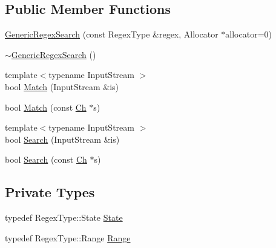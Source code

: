 \subsection*{Public Member Functions}
\begin{DoxyCompactItemize}
\item 
\hyperlink{classinternal_1_1GenericRegexSearch_a72f70e210a4bc944dba62655a008750b}{Generic\+Regex\+Search} (const Regex\+Type \&regex, Allocator $\ast$allocator=0)
\item 
\hyperlink{classinternal_1_1GenericRegexSearch_ad14ee51edf6f9bfe3b7cffa59c4c19c9}{$\sim$\+Generic\+Regex\+Search} ()
\item 
{\footnotesize template$<$typename Input\+Stream $>$ }\\bool \hyperlink{classinternal_1_1GenericRegexSearch_ad204164a20e3ac403b405683b51c2d0b}{Match} (Input\+Stream \&is)
\item 
bool \hyperlink{classinternal_1_1GenericRegexSearch_a9d3fe83905549d2fd4c513b8eacd14de}{Match} (const \hyperlink{classinternal_1_1GenericRegexSearch_a966f3a62fc838b5e9350f4c6a624d9a1}{Ch} $\ast$s)
\item 
{\footnotesize template$<$typename Input\+Stream $>$ }\\bool \hyperlink{classinternal_1_1GenericRegexSearch_a766c684321471b468ff468648f186cf0}{Search} (Input\+Stream \&is)
\item 
bool \hyperlink{classinternal_1_1GenericRegexSearch_a97398161c60f3ed3e4aabaff952c6f1e}{Search} (const \hyperlink{classinternal_1_1GenericRegexSearch_a966f3a62fc838b5e9350f4c6a624d9a1}{Ch} $\ast$s)
\end{DoxyCompactItemize}
\subsection*{Private Types}
\begin{DoxyCompactItemize}
\item 
typedef Regex\+Type\+::\+State \hyperlink{classinternal_1_1GenericRegexSearch_a0586261735313d8cf20042e50ee75c92}{State}
\item 
typedef Regex\+Type\+::\+Range \hyperlink{classinternal_1_1GenericRegexSearch_aaceb6517b628e447c6df61a8b7b33c7c}{Range}
\end{DoxyCompactItemize}
